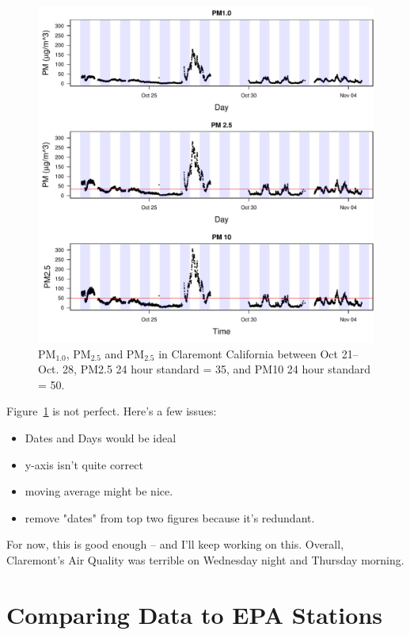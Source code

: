 \documentclass{article}\usepackage[]{graphicx}\usepackage[]{color}
\makeatletter
\def\maxwidth{ %
  \ifdim\Gin@nat@width>\linewidth
    \linewidth
  \else
    \Gin@nat@width
  \fi
}
\newenvironment{knitrout}{}{} %
\def\maxwidth{ %
  \ifdim\Gin@nat@width>\linewidth
    \linewidth
  \else
    \Gin@nat@width
  \fi
}
\makeatother
\begin{document}
\begin{figure}[h]
\begin{knitrout}
\color{fgcolor}
\includegraphics[width=\maxwidth]{figure/unnamed-chunk-5-1} 

\end{knitrout}
\caption{PM$_{1.0}$, PM$_{2.5}$ and PM$_{2.5}$ in Claremont California between Oct 21--Oct. 28, PM2.5 24 hour standard = 35, and PM10 24 hour standard = 50.}
\label{fig:data}
\end{figure}

Figure~\ref{} is not perfect. Here's a few issues:

\begin{itemize}
\item Dates and Days would be ideal
\item y-axis isn't quite correct
\item moving average might be nice. 
\item remove "dates" from top two figures because it's redundant.
\end{itemize}

For now, this is good enough -- and I'll keep working on this. Overall, Claremont's Air Quality was terrible on Wednesday night and Thursday morning. 

\section{Comparing Data to EPA Stations}
\end{document}
